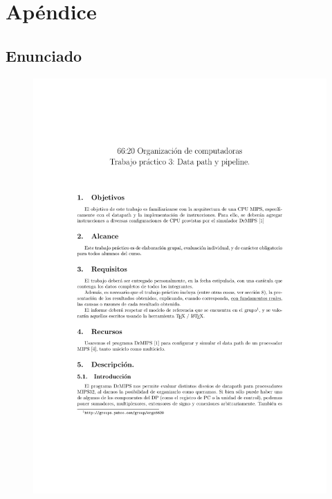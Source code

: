 \documentclass[a4paper, 12pt]{article}
\begin{document}
	
	\newpage
	\section{Apéndice}
	\subsection{Enunciado}

	\begin{figure}[H]
		\centering
		\includegraphics[scale=1, page = 1, clip, trim=1.5in 1.5in 20mm 2in]{files/tp3-c2-2018.pdf}
	\end{figure}
	
\end{document}

